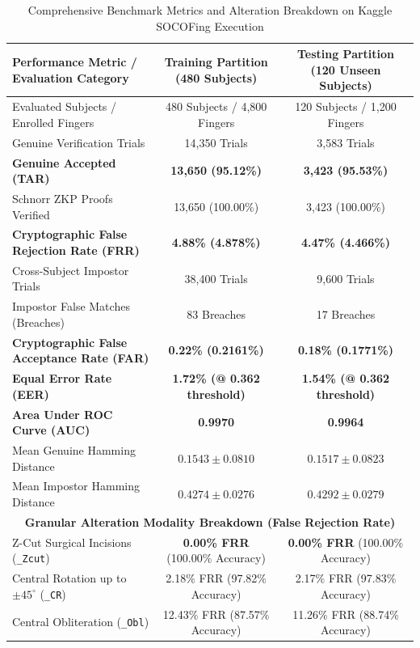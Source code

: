 \documentclass[conference]{IEEEtran}
\begin{document}
\begin{table}[!t]
\centering
\caption{Comprehensive Benchmark Metrics and Alteration Breakdown on Kaggle SOCOFing Execution}
\label{tab:metrics}
\setlength{\tabcolsep}{8pt}
\renewcommand{\arraystretch}{1.12}
\begin{tabular}{lcc}
\toprule
\textbf{Performance Metric / Evaluation Category} & \textbf{Training Partition (480 Subjects)} & \textbf{Testing Partition (120 Unseen Subjects)} \\
\midrule
Evaluated Subjects / Enrolled Fingers & 480 Subjects / 4,800 Fingers & 120 Subjects / 1,200 Fingers \\
Genuine Verification Trials & 14,350 Trials & 3,583 Trials \\
\textbf{Genuine Accepted (TAR)} & \textbf{13,650 (95.12\%)} & \textbf{3,423 (95.53\%)} \\
Schnorr ZKP Proofs Verified & 13,650 (100.00\%) & 3,423 (100.00\%) \\
\textbf{Cryptographic False Rejection Rate (FRR)} & \textbf{4.88\% (4.878\%)} & \textbf{4.47\% (4.466\%)} \\
\midrule
Cross-Subject Impostor Trials & 38,400 Trials & 9,600 Trials \\
Impostor False Matches (Breaches) & 83 Breaches & 17 Breaches \\
\textbf{Cryptographic False Acceptance Rate (FAR)} & \textbf{0.22\% (0.2161\%)} & \textbf{0.18\% (0.1771\%)} \\
\midrule
\textbf{Equal Error Rate (EER)} & \textbf{1.72\% (@ 0.362 threshold)} & \textbf{1.54\% (@ 0.362 threshold)} \\
\textbf{Area Under ROC Curve (AUC)} & \textbf{0.9970} & \textbf{0.9964} \\
Mean Genuine Hamming Distance & $0.1543 \pm 0.0810$ & $0.1517 \pm 0.0823$ \\
Mean Impostor Hamming Distance & $0.4274 \pm 0.0276$ & $0.4292 \pm 0.0279$ \\
\midrule
\multicolumn{3}{c}{\textbf{Granular Alteration Modality Breakdown (False Rejection Rate)}} \\
\midrule
Z-Cut Surgical Incisions (\texttt{\_Zcut}) & \textbf{0.00\% FRR} (100.00\% Accuracy) & \textbf{0.00\% FRR} (100.00\% Accuracy) \\
Central Rotation up to $\pm 45^\circ$ (\texttt{\_CR}) & 2.18\% FRR (97.82\% Accuracy) & 2.17\% FRR (97.83\% Accuracy) \\
Central Obliteration (\texttt{\_Obl}) & 12.43\% FRR (87.57\% Accuracy) & 11.26\% FRR (88.74\% Accuracy) \\
\bottomrule
\end{tabular}
\end{table}
\end{document}
